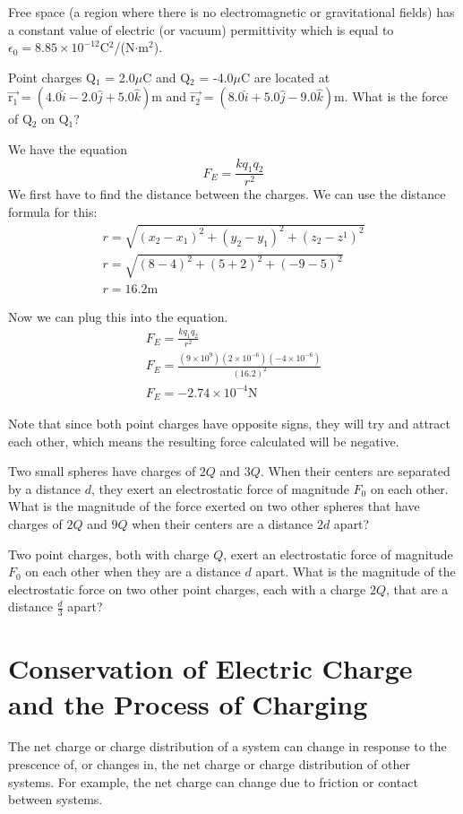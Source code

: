 \documentclass[../em.tex]{subfiles}
\begin{document}
Free space (a region where there is no electromagnetic or gravitational fields) has a 
constant value of electric (or vacuum) permittivity which is equal to $\epsilon_0 = 8.85\times10^{-12}$C$^2$/(N$\cdot$m$^2$).
\begin{example}
    Point charges Q$_1$ = 2.0$\mu$C and Q$_2$ = -4.0$\mu$C are located at $\vec{\text{r}_1} = (4.0\hat{i}-2.0\hat{j}+5.0\hat{k})$m and 
    $\vec{\text{r}_2} = (8.0\hat{i}+5.0\hat{j}-9.0\hat{k})$m. What is the force of Q$_2$ on Q$_1$?

    We have the equation 
    \[F_E=\frac{kq_1q_2}{r^2}\]
    We first have to find the distance between the charges. We can use the distance formula for this:
    \begin{align*}
        r = \sqrt{(x_2-x_1)^2+(y_2-y_1)^2+(z_2-z^1)^2}\\
        r = \sqrt{(8-4)^2+(5+2)^2+(-9-5)^2}\\
        r = 16.2 \text{m}
    \end{align*}

    Now we can plug this into the equation.
    \begin{align*}
        F_E=\frac{kq_1q_2}{r^2}\\
        F_E=\frac{(9\times10^9)(2\times10^{-6})(-4\times10^{-6})}{(16.2)^2}\\
        F_E=-2.74\times10^{-4}\text{N}
    \end{align*}

    Note that since both point charges have opposite signs, they will try and attract each other, which means the resulting force calculated 
    will be negative.
\end{example}

\ex Two small spheres have charges of $2Q$ and $3Q$. When their centers are separated by a distance $d$, they exert an electrostatic force of magnitude $F_0$ on each other. What is the magnitude of the force exerted on two other spheres that have charges of $2Q$ and $9Q$ when their centers are a distance $2d$ apart? 

\ex Two point charges, both with charge $Q$, exert an electrostatic force of magnitude $F_0$ on each other when they are a distance $d$ apart. What is the magnitude of the electrostatic force on two other point charges, each with a charge $2Q$, that are a distance $\frac{d}{3}$ apart?

\section{Conservation of Electric Charge and the Process of Charging}
The net charge or charge distribution of a system can change in response to the prescence of, 
or changes in, the net charge or charge distribution of other systems. For example, the net charge 
can change due to friction or contact between systems.
\end{document}
